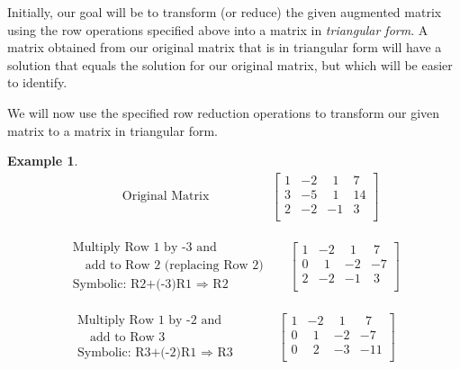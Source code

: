 \documentclass[12pt]{book}
\theoremstyle{definition}
\newtheorem{example}{Example}
\begin{document}
Initially, our goal will be to transform (or reduce) the given augmented matrix using the row operations specified above into a matrix in {\it triangular form}.  A matrix obtained from our original matrix that is in triangular form will have a solution that equals the solution for our original matrix, but which will be easier to identify.\par
We will now use the specified row reduction operations to transform our given matrix to a matrix in triangular form.
\begin{example}
\begin{eqnarray*}
~~~~~~~~~~~~\text{Original~Matrix}%
& &
~~~~~~~~~~~~~~~\left[
\begin{array}{ccc|c}
1 & -2 & ~~1 & 7\\
3 & -5 & ~~1 & 14\\
2 & -2 & -1 & 3~\\
\end{array}\right]
\end{eqnarray*}

\begin{eqnarray*}
\begin{array}{l}
\text{Multiply Row 1 by -3 and}\\
\text{~~~add to Row 2 (replacing Row 2)}\\
\text{Symbolic: R2+(-3)R1~}\Rightarrow \text{~R2}
\end{array}
&&
\left[
\begin{array}{ccc|c}
1 & -2 & ~~1 & ~7\\
0 & ~~1 & -2 & -7\\
2 & -2 & -1 & ~3\\
\end{array}
\right]
\end{eqnarray*}

\begin{eqnarray*}
\begin{array}{l}
\text{Multiply Row 1 by -2 and}\\
\text{~~~add to Row 3}\\
\text{Symbolic: R3+(-2)R1~}\Rightarrow \text{~R3}
\end{array}
&&
~~~~~~~\left[
\begin{array}{ccc|c}
1 & -2 & ~~1 & ~~7\\
0 & ~~1 & -2 & -7\\
0 & ~~2 & -3 & -11\\
\end{array}
\right]
\end{eqnarray*}


\end{example}
\end{document}
